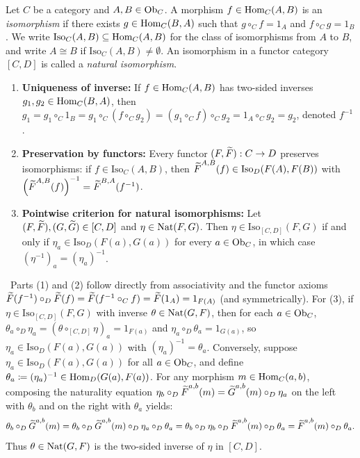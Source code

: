 \documentclass[10pt,a4paper]{article}
\begin{document}
\begin{definition}\label{def:iso}
Let $C$ be a category and $A, B \in {\textrm{Ob}}_C$. A morphism $f \in {\textrm{Hom}}_C(A, B)$ is an \emph{isomorphism} if there exists $g \in {\textrm{Hom}}_C(B, A)$ such that $g \circ_C f = 1_A$ and $f \circ_C g = 1_B$. We write $\mathrm{Iso}_C(A, B) \subseteq {\textrm{Hom}}_C(A, B)$ for the class of isomorphisms from $A$ to $B$, and write $A \cong B$ if $\mathrm{Iso}_C(A, B) \neq \emptyset$. An isomorphism in a functor category $[C, D]$ is called a \emph{natural isomorphism}.
\end{definition}

\begin{theorem}\label{thm:nat_iso}
\begin{enumerate}
\item \textbf{Uniqueness of inverse:} If $f \in {\textrm{Hom}}_C(A,B)$ has two-sided inverses $g_1, g_2 \in {\textrm{Hom}}_C(B,A)$, then $g_1 = g_1 \circ_C 1_B = g_1 \circ_C (f \circ_C g_2) = (g_1 \circ_C f) \circ_C g_2 = 1_A \circ_C g_2 = g_2$, denoted $f^{-1}$.
\item \textbf{Preservation by functors:} Every functor $(F, {\widetilde{F}\textrm{}}) : C \to D$ preserves isomorphisms: if $f \in \mathrm{Iso}_C(A,B)$, then ${\widetilde{F}\textrm{}}^{A,B}(f) \in \mathrm{Iso}_D(F(A), F(B))$ with $\left({\widetilde{F}\textrm{}}^{A,B}(f)\right)^{-1} = {\widetilde{F}\textrm{}}^{B,A}(f^{-1})$.
\item \textbf{Pointwise criterion for natural isomorphisms:} Let $(F, {\widetilde{F}\textrm{}}), (G, {\widetilde{G}\textrm{}}) \in [C, D]$ and $\eta \in {\textrm{Nat}}(F, G)$. Then $\eta \in \mathrm{Iso}_{[C,D]}(F, G)$ if and only if $\eta_a \in \mathrm{Iso}_D(F(a), G(a))$ for every $a \in {\textrm{Ob}}_C$, in which case $(\eta^{-1})_a = (\eta_a)^{-1}$.
\end{enumerate}
\end{theorem}
\myprf\ Parts (1) and (2) follow directly from associativity and the functor axioms ${\widetilde{F}\textrm{}}(f^{-1}) \circ_D {\widetilde{F}\textrm{}}(f) = {\widetilde{F}\textrm{}}(f^{-1} \circ_C f) = {\widetilde{F}\textrm{}}(1_A) = 1_{F(A)}$ (and symmetrically). For (3), if $\eta \in \mathrm{Iso}_{[C,D]}(F, G)$ with inverse $\theta \in {\textrm{Nat}}(G, F)$, then for each $a \in {\textrm{Ob}}_C$, $\theta_a \circ_D \eta_a = (\theta \circ_{[C,D]} \eta)_a = 1_{F(a)}$ and $\eta_a \circ_D \theta_a = 1_{G(a)}$, so $\eta_a \in \mathrm{Iso}_D(F(a), G(a))$ with $(\eta_a)^{-1} = \theta_a$. Conversely, suppose $\eta_a \in \mathrm{Iso}_D(F(a), G(a))$ for all $a \in {\textrm{Ob}}_C$, and define $\theta_a \coloneqq (\eta_a)^{-1} \in {\textrm{Hom}}_D(G(a), F(a))$. For any morphism $m \in {\textrm{Hom}}_C(a,b)$, composing the naturality equation $\eta_b \circ_D {\widetilde{F}\textrm{}}^{a,b}(m) = {\widetilde{G}\textrm{}}^{a,b}(m) \circ_D \eta_a$ on the left with $\theta_b$ and on the right with $\theta_a$ yields:
$$\theta_b \circ_D {\widetilde{G}\textrm{}}^{a,b}(m) = \theta_b \circ_D {\widetilde{G}\textrm{}}^{a,b}(m) \circ_D \eta_a \circ_D \theta_a = \theta_b \circ_D \eta_b \circ_D {\widetilde{F}\textrm{}}^{a,b}(m) \circ_D \theta_a = {\widetilde{F}\textrm{}}^{a,b}(m) \circ_D \theta_a.$$
Thus $\theta \in {\textrm{Nat}}(G, F)$ is the two-sided inverse of $\eta$ in $[C, D]$. \myqed
\end{document}
